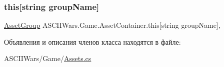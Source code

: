 \subsubsection{\texorpdfstring{this[string group\+Name]}{this[string groupName]}}
{\footnotesize\ttfamily \hyperlink{class_a_s_c_i_i_wars_1_1_game_1_1_asset_group}{Asset\+Group} A\+S\+C\+I\+I\+Wars.\+Game.\+Asset\+Container.\+this\mbox{[}string group\+Name\mbox{]}\hspace{0.3cm}{\ttfamily [get]}, {\ttfamily [set]}}



Объявления и описания членов класса находятся в файле\+:\begin{DoxyCompactItemize}
\item 
A\+S\+C\+I\+I\+Wars/\+Game/\hyperlink{_assets_8cs}{Assets.\+cs}\end{DoxyCompactItemize}
